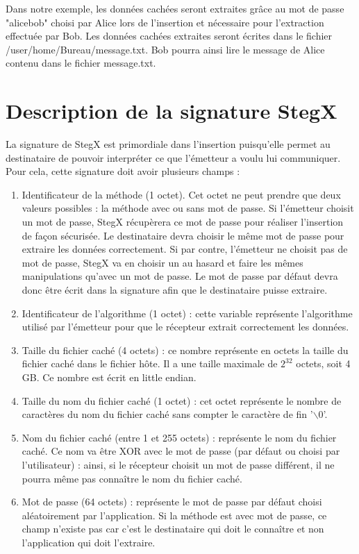 \documentclass[11pt]{article}
\begin{document}
Dans notre exemple, les données cachées seront extraites grâce au mot de passe 
"alicebob" choisi par Alice lors de l'insertion et nécessaire pour l'extraction 
effectuée par Bob. 
Les données cachées extraites seront écrites dans le fichier
/user/home/Bureau/message.txt. Bob pourra ainsi lire le message de Alice 
contenu dans le fichier message.txt. 

\section{Description de la signature StegX}

La signature de StegX est primordiale dans l'insertion puisqu'elle permet au 
destinataire de pouvoir interpréter ce que l'émetteur a voulu lui communiquer. 
Pour cela, cette signature doit avoir plusieurs champs : 
\begin {enumerate}
\item Identificateur de la méthode (1 octet). Cet octet ne 
peut prendre que deux valeurs possibles : la méthode avec ou sans mot de 
passe. Si l'émetteur choisit un mot de passe, StegX récupèrera ce mot de 
passe pour réaliser l'insertion de façon sécurisée. Le destinataire devra 
choisir le même mot de passe pour extraire les données correctement. 
Si par contre, l'émetteur ne choisit pas de mot de passe, StegX va en choisir 
un au hasard et faire les mêmes manipulations qu'avec un mot de passe. 
Le mot de passe par défaut devra donc être écrit dans la signature afin que 
le destinataire puisse extraire. 
\item Identificateur de l'algorithme (1 octet) : cette variable représente 
l'algorithme utilisé par l'émetteur pour que le récepteur extrait correctement 
les données. 
\item Taille du fichier caché (4 octets) : ce nombre représente en octets 
la taille du fichier caché dans le fichier hôte. Il a une taille maximale 
de $2^{32}$ octets, soit 4 GB. Ce nombre est écrit en little endian. 
\item Taille du nom du fichier caché (1 octet) : cet octet représente le 
nombre de caractères du nom du fichier caché sans compter le caractère de 
fin '$\backslash$0'.
\item Nom du fichier caché (entre 1 et 255 octets) : représente le nom du 
fichier caché. Ce nom va être XOR avec le mot de passe (par défaut ou choisi
par l'utilisateur) : ainsi, si le récepteur choisit un mot de passe différent, 
il ne pourra même pas connaître le nom du fichier caché. 
\item Mot de passe (64 octets) : représente le mot de passe par défaut choisi 
aléatoirement par l'application. Si la méthode est avec mot de passe, 
ce champ n'existe pas car c'est le destinataire qui doit le connaître et 
non l'application qui doit l'extraire. 
\end{enumerate}
\end{document}

